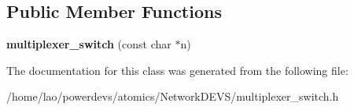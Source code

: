\subsection*{Public Member Functions}
\begin{DoxyCompactItemize}
\item 
{\bfseries multiplexer\+\_\+switch} (const char $\ast$n)\hypertarget{classmultiplexer__switch_a65f29980d531ee7d46506763ac9631c1}{}\label{classmultiplexer__switch_a65f29980d531ee7d46506763ac9631c1}

\end{DoxyCompactItemize}


The documentation for this class was generated from the following file\+:\begin{DoxyCompactItemize}
\item 
/home/lao/powerdevs/atomics/\+Network\+D\+E\+V\+S/multiplexer\+\_\+switch.\+h\end{DoxyCompactItemize}
